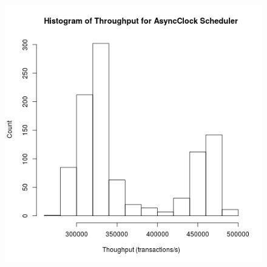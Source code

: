 \clearpage


\begin{figure}
\center
\includegraphics[width=\textwidth]{async_clock_throughput_hist.png}
\caption{\label{async_clock_throughput}}
\end{figure}

